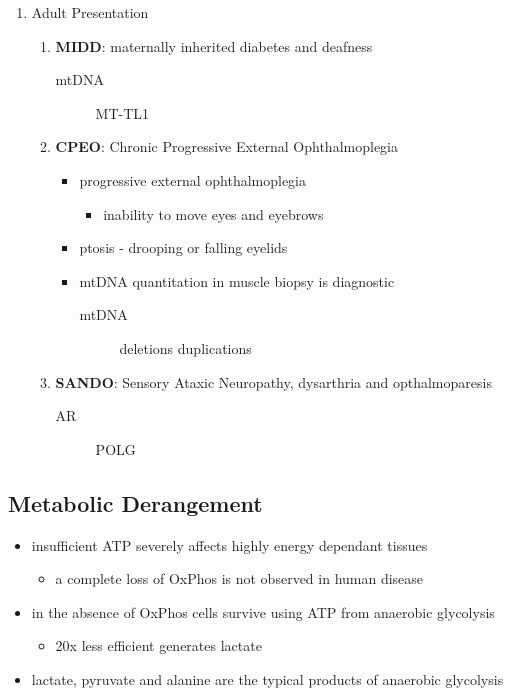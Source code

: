 \documentclass[12pt]{scrartcl}
\begin{document}
\begin{enumerate}
\begin{enumerate}
\end{enumerate}
\item Adult Presentation
\label{sec:orge47d43b}
\begin{enumerate}
\item \textbf{MIDD}: maternally inherited diabetes and deafness
\label{sec:org10e5025}
\begin{description}
\item[{mtDNA}] MT-TL1
\end{description}
\item \textbf{CPEO}: Chronic Progressive External Ophthalmoplegia
\label{sec:org43763cc}
\begin{itemize}
\item progressive external ophthalmoplegia
\begin{itemize}
\item inability to move eyes and eyebrows
\end{itemize}
\item ptosis - drooping or falling eyelids
\item mtDNA quantitation in muscle biopsy is diagnostic
\begin{description}
\item[{mtDNA}] deletions \textpm{} duplications
\end{description}
\end{itemize}

\item \textbf{SANDO}: Sensory Ataxic Neuropathy, dysarthria and opthalmoparesis
\label{sec:org55e57e3}
\begin{description}
\item[{AR}] POLG
\end{description}
\end{enumerate}
\end{enumerate}

\subsection{Metabolic Derangement}
\label{sec:org125a321}
\begin{itemize}
\item insufficient ATP severely affects highly energy dependant tissues
\begin{itemize}
\item a complete loss of OxPhos is not observed in human disease
\end{itemize}
\item in the absence of OxPhos cells survive using ATP from anaerobic glycolysis
\begin{itemize}
\item 20x less efficient generates lactate
\end{itemize}
\item lactate, pyruvate and alanine are the typical products of anaerobic glycolysis
\end{itemize}
\end{document}
